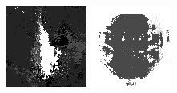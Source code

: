 \documentclass{article}
\begin{document}
\begin{figure}[t]
\begin{minipage}[c]{.21\linewidth}
  \end{minipage}
  \begin{minipage}[c]{.21\linewidth}
    \centering\centerline{\includegraphics[width=\linewidth]{imgs/gens_cal/saxophone/sums/0_1.png}}
  \end{minipage}
  \begin{minipage}[c]{.21\linewidth}
    \centering\centerline{\includegraphics[width=\linewidth]{imgs/gens_cal/stop/sums/0_1.png}}

\end{minipage}
\end{figure}
\end{document}
